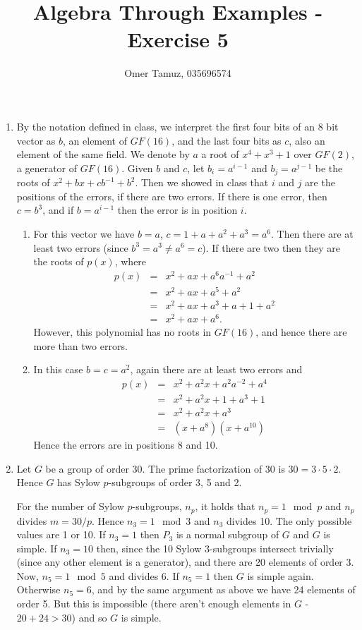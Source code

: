 \documentclass[11pt]{article} \usepackage{amssymb}
\begin{document}
\title{Algebra Through Examples - Exercise 5}

 \author{Omer Tamuz, 035696574}
\maketitle


\begin{enumerate}
\item 
  By the notation defined in class, we interpret the first four bits of
  an 8 bit vector as $b$, an element of $GF(16)$, and the last four
  bits as $c$, also an element of the same field. We denote by $a$ a root of
  $x^4+x^3+1$ over $GF(2)$, a generator
  of $GF(16)$. Given $b$ and $c$, let $b_i=a^{i-1}$ and $b_j=a^{j-1}$ be the 
  roots of
  $x^2+bx+cb^{-1}+b^2$. Then we showed in class that $i$ and $j$ are the 
  positions of the errors, if there are two errors. If there is one error, then
  $c=b^3$, and if $b=a^{i-1}$ then the error is in position $i$. 
  \begin{enumerate}
  \item 
    For this vector we have $b=a$, $c=1+a+a^2+a^3=a^6$. Then there are at least
    two errors (since $b^3=a^3 \neq a^6=c$). If there are two then they are the roots 
    of $p(x)$, where 
    \begin{eqnarray*}
      p(x)&=& x^2+ax+a^6a^{-1}+a^2
      \\ &=&  x^2+ax+a^5+a^2
      \\ &=& x^2+ax+a^3+a+1+a^2
      \\ &=& x^2+ax+a^6.
    \end{eqnarray*}
    However, this polynomial has no roots in $GF(16)$, and hence there are more
    than two errors.
  \item
    In this case $b=c=a^2$, again there are at least two errors and
    \begin{eqnarray*}
      p(x)&=& x^2+a^2x+a^2a^{-2}+a^4
      \\ &=&  x^2+a^2x+1+a^3+1
      \\ &=& x^2+a^2x+a^3
      \\ &=& (x+a^8)(x+a^{10})
    \end{eqnarray*}
    Hence the errors are in positions 8 and 10.
  \end{enumerate}
\item
  Let $G$ be a group of order 30. The prime factorization of 30 is 
  $30=3 \cdot 5 \cdot 2$. 
  Hence $G$ has Sylow $p$-subgroups of order 3, 5 and 2. 

  For the number of Sylow $p$-subgroups, $n_p$, it holds that $n_p=1\mod p$ and
  $n_p$ divides $m=30/p$. Hence $n_3=1 \mod 3$ and $n_3$ divides 10. The only
  possible values are 1 or 10. If $n_3=1$ then $P_3$ is a normal subgroup 
  of $G$ and $G$ is simple. If $n_3=10$ then, since the 10 Sylow 3-subgroups
  intersect trivially (since any other element is a generator), and there
  are 20 elements of order 3. Now, $n_5=1\mod 5$ and divides 6. If $n_5=1$ then
  $G$ is simple again. Otherwise $n_5=6$, and by the same argument as above
  we have 24 elements of order 5. But this is impossible (there aren't enough
  elements in $G$ - $20+24>30$) and so $G$ is simple.


\end{enumerate}
\end{document}

